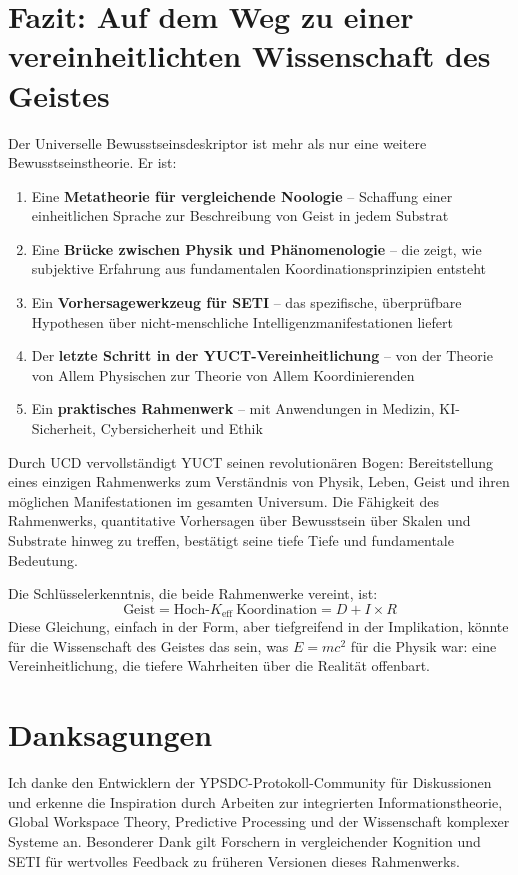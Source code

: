 \documentclass[12pt,a4paper]{article}
\newcommand{\eff}{\mathrm{eff}}
\newcommand{\Ke}{K_{\eff}}
\begin{document}
	\section{Fazit: Auf dem Weg zu einer vereinheitlichten Wissenschaft des Geistes}
	
	Der Universelle Bewusstseinsdeskriptor ist mehr als nur eine weitere Bewusstseinstheorie. Er ist:
	\begin{enumerate}
		\item Eine \textbf{Metatheorie für vergleichende Noologie} -- Schaffung einer einheitlichen Sprache zur Beschreibung von Geist in jedem Substrat
		\item Eine \textbf{Brücke zwischen Physik und Phänomenologie} -- die zeigt, wie subjektive Erfahrung aus fundamentalen Koordinationsprinzipien entsteht
		\item Ein \textbf{Vorhersagewerkzeug für SETI} -- das spezifische, überprüfbare Hypothesen über nicht-menschliche Intelligenzmanifestationen liefert
		\item Der \textbf{letzte Schritt in der YUCT-Vereinheitlichung} -- von der Theorie von Allem Physischen zur Theorie von Allem Koordinierenden
		\item Ein \textbf{praktisches Rahmenwerk} -- mit Anwendungen in Medizin, KI-Sicherheit, Cybersicherheit und Ethik
	\end{enumerate}
	
	Durch UCD vervollständigt YUCT seinen revolutionären Bogen: Bereitstellung eines einzigen Rahmenwerks zum Verständnis von Physik, Leben, Geist und ihren möglichen Manifestationen im gesamten Universum. Die Fähigkeit des Rahmenwerks, quantitative Vorhersagen über Bewusstsein über Skalen und Substrate hinweg zu treffen, bestätigt seine tiefe Tiefe und fundamentale Bedeutung.
	
	Die Schlüsselerkenntnis, die beide Rahmenwerke vereint, ist:
	\[
	\boxed{\text{Geist} = \text{Hoch-}\Ke\ \text{Koordination} = D + I \times R}
	\]
	Diese Gleichung, einfach in der Form, aber tiefgreifend in der Implikation, könnte für die Wissenschaft des Geistes das sein, was \(E = mc^2\) für die Physik war: eine Vereinheitlichung, die tiefere Wahrheiten über die Realität offenbart.
	
	\section*{Danksagungen}
	
	Ich danke den Entwicklern der YPSDC-Protokoll-Community für Diskussionen und erkenne die Inspiration durch Arbeiten zur integrierten Informationstheorie, Global Workspace Theory, Predictive Processing und der Wissenschaft komplexer Systeme an. Besonderer Dank gilt Forschern in vergleichender Kognition und SETI für wertvolles Feedback zu früheren Versionen dieses Rahmenwerks.
	
\end{document}

